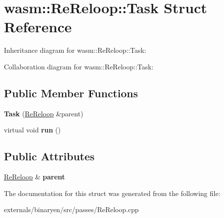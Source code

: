\hypertarget{structwasm_1_1_re_reloop_1_1_task}{}\section{wasm\+:\+:Re\+Reloop\+:\+:Task Struct Reference}
\label{structwasm_1_1_re_reloop_1_1_task}


Inheritance diagram for wasm\+:\+:Re\+Reloop\+:\+:Task\+:


Collaboration diagram for wasm\+:\+:Re\+Reloop\+:\+:Task\+:
\subsection*{Public Member Functions}
\begin{DoxyCompactItemize}
\item 
\mbox{\label{structwasm_1_1_re_reloop_1_1_task_a1cc309909012ddb023509056951428e7}} 
{\bfseries Task} (\mbox{\hyperlink{structwasm_1_1_re_reloop}{Re\+Reloop}} \&parent)
\item 
\mbox{\label{structwasm_1_1_re_reloop_1_1_task_a631aa19d9d1a9aa351d22cd653c4e6a7}} 
virtual void {\bfseries run} ()
\end{DoxyCompactItemize}
\subsection*{Public Attributes}
\begin{DoxyCompactItemize}
\item 
\mbox{\label{structwasm_1_1_re_reloop_1_1_task_ae4901b8ae1a6662933f68fb4c93d0539}} 
\mbox{\hyperlink{structwasm_1_1_re_reloop}{Re\+Reloop}} \& {\bfseries parent}
\end{DoxyCompactItemize}


The documentation for this struct was generated from the following file\+:\begin{DoxyCompactItemize}
\item 
externals/binaryen/src/passes/Re\+Reloop.\+cpp\end{DoxyCompactItemize}
